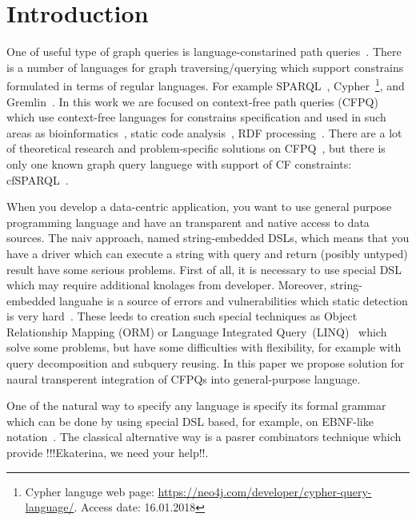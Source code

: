 \section{Introduction}

One of useful type of graph queries is language-constarined path queries~\cite{FLCpathProblem}.
There is a number of languages for graph traversing/querying which support constrains formulated in terms of regular languages.
For example SPARQL~\cite{sparql}, Cypher~\footnote{Cypher languge web page: \url{https://neo4j.com/developer/cypher-query-language/}. Access date: 16.01.2018}, and Gremlin~\cite{gremlin}.
In this work we are focused on context-free path queries (CFPQ) which use context-free languages for constrains specification and used in such areas as bioinformatics~\cite{GraphQueryWithEarley}, static code analysis~\cite{Reps, Zheng, LabelFlowCFLReachability, specificationCFLReachability}, RDF processing~\cite{CFGonRDF}. 
There are a lot of theoretical research and problem-specific solutions on CFPQ~\cite{Yannakakis, ConjCFPathQuery, Hellings16, QueryGraphWithData, RegularDBQuery, GraphQueryWithEarley, graphDB}, but there is only one known graph query languege with support of CF constraints: cfSPARQL~\cite{CFGonRDF}.

When you develop a data-centric application, you want to use general purpose programming language and have an transparent and native access to data sources.
The naiv approach, named string-embedded DSLs, which means that you have a driver which can execute a string with query and return (posibly untyped) result have some serious problems.
First of all, it is necessary to use special DSL which may require additional knolages from developer.
Moreover, string-embedded languahe is a source of errors and vulnerabilities which static detection is very hard~\cite{stringEmbeddedLanguagesProblem}.  
These leeds to creation such special techniques as Object Relationship Mapping (ORM) or Language Integrated Query~(LINQ)~\cite{LINQ1, LINQ2} which solve some problems, but have some difficulties with flexibility, for example with query decomposition and subquery reusing.
In this paper we propose solution for naural transperent integration of CFPQs into general-purpose language. 

One of the natural way to specify any language is specify its formal grammar which can be done by using special DSL based, for example, on EBNF-like notation~\cite{EBNFISO}.
The classical alternative way is a pasrer combinators technique which provide !!!Ekaterina, we need your help!!.

